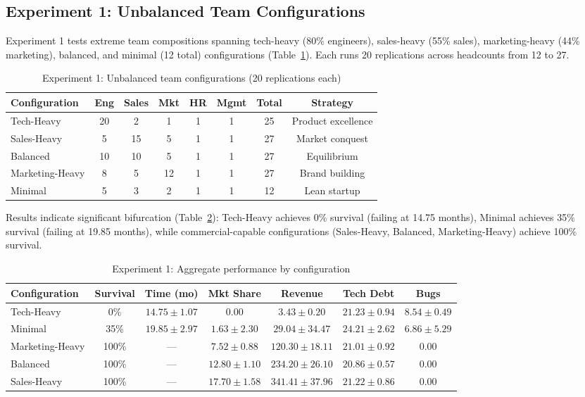 \documentclass[alpha-refs]{wiley-article}
\begin{document}
\subsection{Experiment 1: Unbalanced Team Configurations}

Experiment 1 tests extreme team compositions spanning tech-heavy (80\% engineers), sales-heavy (55\% sales), marketing-heavy (44\% marketing), balanced, and minimal (12 total) configurations (Table~\ref{tab:exp1_configs}). Each runs 20 replications across headcounts from 12 to 27.

\begin{table}[!htbp]
\centering
\caption{Experiment 1: Unbalanced team configurations (20 replications each)}
\label{tab:exp1_configs}
\small
\begin{tabular}{|l|c|c|c|c|c|c|c|}
\hline
\textbf{Configuration} & \textbf{Eng} & \textbf{Sales} & \textbf{Mkt} & \textbf{HR} & \textbf{Mgmt} & \textbf{Total} & \textbf{Strategy} \\
\hline
Tech-Heavy & 20 & 2 & 1 & 1 & 1 & 25 & Product excellence \\
Sales-Heavy & 5 & 15 & 5 & 1 & 1 & 27 & Market conquest \\
Balanced & 10 & 10 & 5 & 1 & 1 & 27 & Equilibrium \\
Marketing-Heavy & 8 & 5 & 12 & 1 & 1 & 27 & Brand building \\
Minimal & 5 & 3 & 2 & 1 & 1 & 12 & Lean startup \\
\hline
\end{tabular}
\end{table}

Results indicate significant bifurcation (Table~\ref{tab:exp1_summary_results}): Tech-Heavy achieves 0\% survival (failing at 14.75 months), Minimal achieves 35\% survival (failing at 19.85 months), while commercial-capable configurations (Sales-Heavy, Balanced, Marketing-Heavy) achieve 100\% survival.

\begin{table}[!htbp]
\centering
\caption{Experiment 1: Aggregate performance by configuration}
\label{tab:exp1_summary_results}
\small
\begin{tabular}{|l|c|c|c|c|c|c|}
\hline
\textbf{Configuration} & \textbf{Survival} & \textbf{Time (mo)} & \textbf{Mkt Share} & \textbf{Revenue} & \textbf{Tech Debt} & \textbf{Bugs} \\
\hline
Tech-Heavy & 0\% & $14.75 \pm 1.07$ & $0.00$ & $3.43 \pm 0.20$ & $21.23 \pm 0.94$ & $8.54 \pm 0.49$ \\
Minimal & 35\% & $19.85 \pm 2.97$ & $1.63 \pm 2.30$ & $29.04 \pm 34.47$ & $24.21 \pm 2.62$ & $6.86 \pm 5.29$ \\
Marketing-Heavy & 100\% & --- & $7.52 \pm 0.88$ & $120.30 \pm 18.11$ & $21.01 \pm 0.92$ & $0.00$ \\
Balanced & 100\% & --- & $12.80 \pm 1.10$ & $234.20 \pm 26.10$ & $20.86 \pm 0.57$ & $0.00$ \\
Sales-Heavy & 100\% & --- & $17.70 \pm 1.58$ & $341.41 \pm 37.96$ & $21.22 \pm 0.86$ & $0.00$ \\
\hline
\end{tabular}
\end{table}
\end{document}
